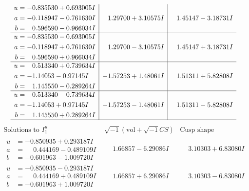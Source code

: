 \documentclass[1p]{elsarticle_modified}
\theoremstyle{definition}
\newcommand{\I}{\sqrt{-1}}
\begin{document}
$$\begin{array}{c|c|c}
\begin{aligned}
u &= -0.835530 + 0.693005 I \\
a &= -0.118947 - 0.761630 I \\
b &= \phantom{-}0.596590 - 0.966034 I\end{aligned}
 & \phantom{-}1.29700 + 3.10575 I & \phantom{-}1.45147 - 3.18731 I \\ \hline\begin{aligned}
u &= -0.835530 - 0.693005 I \\
a &= -0.118947 + 0.761630 I \\
b &= \phantom{-}0.596590 + 0.966034 I\end{aligned}
 & \phantom{-}1.29700 - 3.10575 I & \phantom{-}1.45147 + 3.18731 I \\ \hline\begin{aligned}
u &= \phantom{-}0.513340 + 0.739634 I \\
a &= -1.14053 - 0.97145 I \\
b &= \phantom{-}1.145550 - 0.289264 I\end{aligned}
 & -1.57253 + 1.48061 I & \phantom{-}1.51311 + 5.82808 I \\ \hline\begin{aligned}
u &= \phantom{-}0.513340 - 0.739634 I \\
a &= -1.14053 + 0.97145 I \\
b &= \phantom{-}1.145550 + 0.289264 I\end{aligned}
 & -1.57253 - 1.48061 I & \phantom{-}1.51311 - 5.82808 I\\
 \hline 
 \end{array}$$\newpage$$\begin{array}{c|c|c}  
\text{Solutions to }I^u_{1}& \I (\text{vol} + \sqrt{-1}CS) & \text{Cusp shape}\\
 \hline 
\begin{aligned}
u &= -0.850935 + 0.293187 I \\
a &= \phantom{-}0.444169 - 0.489109 I \\
b &= -0.601963 - 1.009720 I\end{aligned}
 & \phantom{-}1.66857 - 6.29086 I & \phantom{-}3.10303 + 6.83080 I \\ \hline\begin{aligned}
u &= -0.850935 - 0.293187 I \\
a &= \phantom{-}0.444169 + 0.489109 I \\
b &= -0.601963 + 1.009720 I\end{aligned}
 & \phantom{-}1.66857 + 6.29086 I & \phantom{-}3.10303 - 6.83080 I \\ \hline\begin{aligned}

\end{aligned}
\end{array}$$
\end{document}
